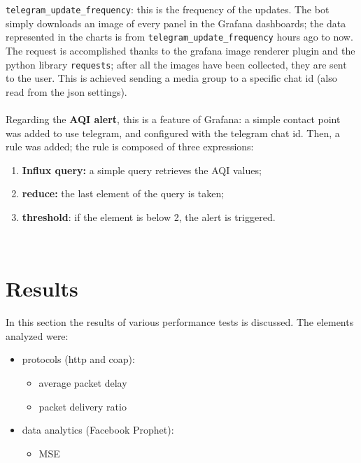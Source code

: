 \documentclass[]{article}
\begin{document}
\texttt{telegram\_update\_frequency}: this is the frequency of the updates. The bot simply downloads an image of every panel in the Grafana dashboards; the data represented in the charts is from \texttt{telegram\_update\_frequency} hours ago to now. The request is accomplished thanks to the grafana image renderer plugin and the python library \texttt{requests}; after all the images have been collected, they are sent to the user. This is achieved sending a media group to a specific chat id (also read from the json settings).
\\
\\
Regarding the \textbf{AQI alert}, this is a feature of Grafana: a simple contact point was added to use telegram, and configured with the telegram chat id. Then, a rule was added; the rule is composed of three expressions:
\begin{enumerate}
	\item \textbf{Influx query:} a simple query retrieves the AQI values;
	\item \textbf{reduce:} the last element of the query is taken;
	\item \textbf{threshold}: if the element is below 2, the alert is triggered.
\end{enumerate}



\begin{lstlisting}
	
\end{lstlisting}

\section{Results}

In this section the results of various performance tests is discussed. The elements analyzed were:
\begin{itemize}
	\item protocols (http and coap):
	\begin{itemize}
		\item average packet delay
		\item packet delivery ratio
	\end{itemize}
	\item data analytics (Facebook Prophet):
	\begin{itemize}
		\item MSE
	\end{itemize}
\end{itemize}
\end{document}
